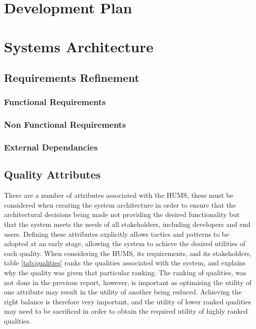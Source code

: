 \documentclass[10pt,a4paper]{article}
\begin{document}
\section{Development Plan}
\label{sec:dev_plan}

\section{Systems Architecture}
\label{sec:systems_architecture}


\subsection{Requirements Refinement}
\label{sec:requirements}


\subsubsection{Functional Requirements}
\label{sec:functional_requirements}


\subsubsection{Non Functional Requirements}
\label{sec:nonfunctional_requirements}


\subsubsection{External Dependancies}
 \label{sec:external_dependancies}

\subsection{Quality Attributes}
\label{sec:qualities}
There are a number of attributes associated with the HUMS, these must be considered when creating the system architecture in order to ensure that the architectural decisions being made not providing the desired functionality but that the system meets the needs of all stakeholders, including developers and end users.
Defining these attributes explicitly allows tactics and patterns to be adopted at an early stage, allowing the system to achieve the desired utilities of each quality.
When considering the HUMS, its requirements, and its stakeholders, table \ref{tab:qualities} ranks the qualities associated with the system, and explains why the quality was given that particular ranking. The ranking of qualities, was not done in the previous report, however,  is important as optimising the utility of one attribute may result in the utility of another being reduced. Achieving the right balance is therefore very important, and the utility of lower ranked qualities may need to be sacrificed in order to obtain the required utility of highly ranked qualities. 
\end{document}
